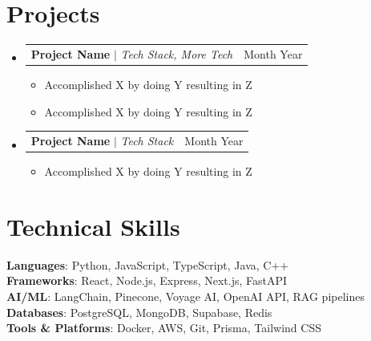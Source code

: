 \documentclass[letterpaper,11pt]{article}
\makeatletter
\newcommand{\resumeItem}[1]{
  \item\small{
    {#1 \vspace{-2pt}}
  }
}
\newcommand{\resumeProjectHeading}[2]{
    \item
    \begin{tabular*}{0.97\textwidth}{l@{\extracolsep{\fill}}r}
      \small#1 & #2 \\
    \end{tabular*}\vspace{-7pt}
}
\newcommand{\resumeSubHeadingListStart}{\begin{itemize}[leftmargin=0.15in, label={}]}
\newcommand{\resumeSubHeadingListEnd}{\end{itemize}}
\newcommand{\resumeItemListStart}{\begin{itemize}}
\newcommand{\resumeItemListEnd}{\end{itemize}\vspace{-5pt}}
\makeatother
\begin{document}
\section{Projects}
    \resumeSubHeadingListStart
      \resumeProjectHeading
          {\textbf{Project Name} $|$ \emph{Tech Stack, More Tech}}{Month Year}
          \resumeItemListStart
            \resumeItem{Accomplished X by doing Y resulting in Z}
            \resumeItem{Accomplished X by doing Y resulting in Z}
          \resumeItemListEnd
      \resumeProjectHeading
          {\textbf{Project Name} $|$ \emph{Tech Stack}}{Month Year}
          \resumeItemListStart
            \resumeItem{Accomplished X by doing Y resulting in Z}
          \resumeItemListEnd
    \resumeSubHeadingListEnd

\section{Technical Skills}
 \begin{itemize}[leftmargin=0.15in, label={}]
    \small{\item{
     \textbf{Languages}{: Python, JavaScript, TypeScript, Java, C++} \\
     \textbf{Frameworks}{: React, Node.js, Express, Next.js, FastAPI} \\
     \textbf{AI/ML}{: LangChain, Pinecone, Voyage AI, OpenAI API, RAG pipelines} \\
     \textbf{Databases}{: PostgreSQL, MongoDB, Supabase, Redis} \\
     \textbf{Tools \& Platforms}{: Docker, AWS, Git, Prisma, Tailwind CSS}
    }}
 \end{itemize}

\end{document}
